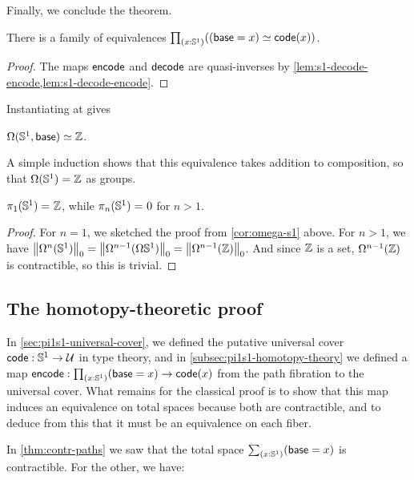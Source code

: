 Finally, we conclude the theorem.

\begin{thm} 
There is a family of equivalences $\prd{x : \Sn ^1} (\eqv {(\base=x)} {\code(x)})$.
\end{thm}
\begin{proof}
The maps $\encode$ and $\decode$ are quasi-inverses by
\autoref{lem:s1-decode-encode,lem:s1-decode-encode}.
\end{proof}

Instantiating at {\base} gives
\begin{cor}\label{cor:omega-s1}
$\eqv {\Omega(\Sn^1,\base)} {\Z}$.
\end{cor}

A simple induction shows that this equivalence takes addition to
composition, so that $\Omega(\Sn ^1) = \Z$ as groups.

\begin{cor} \label{cor:pi1s1}
$\id{\pi_1(\Sn ^1)} {\Z}$, while $\id{\pi_n(\Sn ^1)}0$ for $n>1$.
\end{cor}
\begin{proof}
For $n=1$, we sketched the proof from \autoref{cor:omega-s1} above.
For $n > 1$, we have $\trunc 0 {\Omega^{n}(\Sn ^1)} = \trunc 0 {\Omega^{n-1}(\Omega{\Sn ^1})} = \trunc 0 {\Omega^{n-1}(\Z)}$.
And since $\Z$ is a set, $\Omega^{n-1}(\Z)$ is contractible, so this is trivial.
\end{proof}

%


\subsection{The homotopy-theoretic proof}
\label{subsec:pi1s1-homotopy-theory}

In \autoref{sec:pi1s1-universal-cover}, we defined the putative universal cover $\code:\Sn^1\to\type$ in type theory, and in \autoref{subsec:pi1s1-homotopy-theory} we defined a map $\encode : \prd{x:\Sn^1} (\base=x) \to \code(x)$ from the path fibration to the universal cover.
What remains for the classical proof is to show that this map induces an equivalence on total spaces because both are contractible, and to deduce from this that it must be an equivalence on each fiber.

%
In \autoref{thm:contr-paths} we saw that the total space $\sm{x:\Sn^1} (\base=x)$ is contractible.
For the other, we have:

